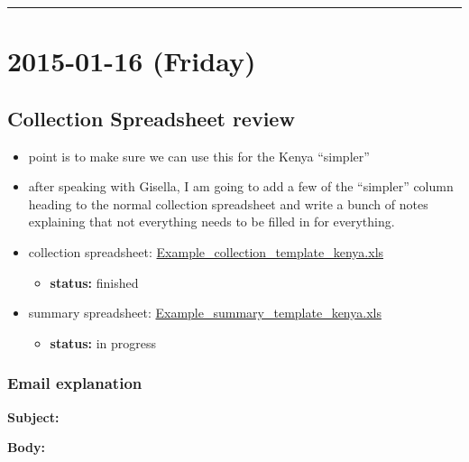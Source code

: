 \documentclass[letterpaper]{scrartcl}
\begin{document}
\begin{center}\rule{0.5\linewidth}{\linethickness}\end{center}

\section{2015-01-16 (Friday)}\label{friday-2}

\subsection{Collection Spreadsheet
review}\label{collection-spreadsheet-review}

\begin{itemize}
\itemsep1pt\parskip0pt
\item
  point is to make sure we can use this for the Kenya ``simpler''
\item
  after speaking with Gisella, I am going to add a few of the
  ``simpler'' column heading to the normal collection spreadsheet and
  write a bunch of notes explaining that not everything needs to be
  filled in for everything.
\item
  collection spreadsheet:
  \href{file:///home/gus/Dropbox/uganda\%20data/collection_sheet_templates/Example_collection_template_kenya.xls}{Example\_collection\_template\_kenya.xls}

  \begin{itemize}
  \itemsep1pt\parskip0pt
  \item
    \textbf{status:} finished
  \end{itemize}
\item
  summary spreadsheet:
  \href{file:///home/gus/Dropbox/uganda\%20data/collection_sheet_templates/Example_summary_template_kenya.xls}{Example\_summary\_template\_kenya.xls}

  \begin{itemize}
  \itemsep1pt\parskip0pt
  \item
    \textbf{status:} in progress
  \end{itemize}
\end{itemize}

\subsubsection{Email explanation}\label{email-explanation}

\textbf{Subject:}

\textbf{Body:}
\end{document}
